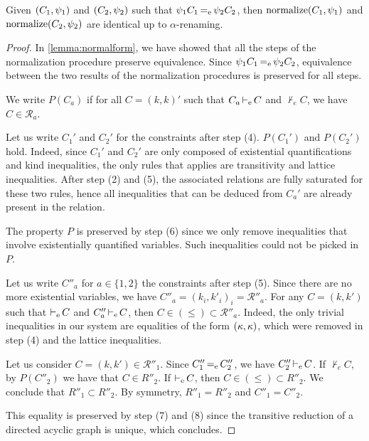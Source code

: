 \begin{lemma}[Uniqueness]
  Given $(C_1,\mathrm{\psi}_1)$ and $(C_2,\mathrm{\psi}_2)$ such that
  $\mathrm{\psi}_1 C_1 \operatorname{=_e} \mathrm{\psi}_2 C_2$, then
  $\operatorname{normalize}(C_1,\mathrm{\psi}_1)$ and $\operatorname{normalize}(C_2,\mathrm{\psi}_2)$
  are identical up to $\alpha$-renaming.
\end{lemma}
\begin{proof}
  In \cref{lemma:normalform}, we have showed that all the steps of the
  normalization procedure preserve equivalence.
  Since $\mathrm{\psi}_1 C_1 \operatorname{=_e} \mathrm{\psi}_2 C_2$, equivalence between
  the two results of the normalization procedures is preserved for all steps.

  We write $P(C_a)$ if for all $C = (k, k)'$
  such that $C_a \operatorname{\vdash_e} C$ and $\nvdash_eC$,
  we have $C \in {\mathcal R}_a$.

  Let us write $C_1'$ and $C_2'$ for the constraints after step (4). $P(C_1')$ and
  $P(C_2')$ hold. Indeed, since $C_1'$ and $C_2'$ are only composed
  of existential quantifications and kind inequalities, the only rules
  that applies are transitivity and lattice inequalities.
  After step (2) and (5), the associated relations are fully saturated for these
  two rules, hence all inequalities that can be deduced from $C_a'$ are already
  present in the relation.

  The property $P$ is preserved by step (6) since we only remove
  inequalities that involve existentially quantified variables. Such
  inequalities could not be picked in $P$.

  Let us write $C''_a$ for $a\in\{1,2\}$ the constraints after step (5).
  Since there are no more existential variables,
  we have $C''_a=(k_i,k'_i)_i=\mathcal R''_a$.
  For any $C=(k,k')$ such that $\operatorname{\vdash_e} C$ and $C''_a \operatorname{\vdash_e} C$,
  then $C \in (\leq) \subset {\mathcal R}''_a$.
  Indeed, the only trivial inequalities in our system are equalities of the form
  $(\kappa, \kappa)$, which were removed in step (4) and the lattice inequalities.

  Let us consider $C = (k,k') \in \mathcal R''_1$.
  Since $C''_1\operatorname{=_e} C''_2$, we have $C''_2 \operatorname{\vdash_e} C$.
  If $\nvdash_e{C}$, by $P(C''_2)$ we have that
  $C\in R''_2$.
  If $\operatorname{\vdash_e} C$, then $C\in (\leq) \subset R''_2$.
  We conclude that $R''_1 \subset R''_2$.
  By symmetry, $R''_1 = R''_2$ and $C''_1 = C''_2$.

  This equality is preserved by step (7) and (8)
  since the transitive reduction of a directed acyclic graph is unique,
  which concludes.
\end{proof}

